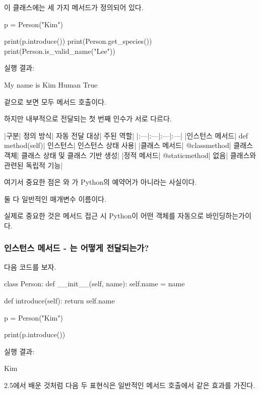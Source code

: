 이 클래스에는 세 가지 메서드가 정의되어 있다.

\begin{dhkcode}
p = Person("Kim")

print(p.introduce())
print(Person.get_species())
print(Person.is_valid_name("Lee"))
\end{dhkcode}

실행 결과:

\begin{dhkzsh}
My name is Kim
Human
True
\end{dhkzsh}

겉으로 보면 모두 메서드 호출이다.

하지만 내부적으로 전달되는 첫 번째 인수가 서로 다르다.

\begin{dhktable}
|구분|	정의 방식|	자동 전달 대상|	주된 역할|
|:---|:---|:---|:---|
|인스턴스 메서드|	def method(self)|	인스턴스|	인스턴스 상태 사용|
|클래스 메서드|	@classmethod|	클래스 객체|	클래스 상태 및 클래스 기반 생성|
|정적 메서드|	@staticmethod|	없음|	클래스와 관련된 독립적 기능|
\end{dhktable}

여기서 중요한 점은 와 가 Python의 예약어가 아니라는 사실이다.

둘 다 일반적인 매개변수 이름이다.

실제로 중요한 것은 메서드 접근 시 Python이 어떤 객체를 자동으로 바인딩하는가이다.

\subsubsection{인스턴스 메서드 - 는 어떻게 전달되는가?}

다음 코드를 보자.

\begin{dhkcode}
class Person:
    def __init__(self, name):
        self.name = name

    def introduce(self):
        return self.name

p = Person("Kim")

print(p.introduce())
\end{dhkcode}

실행 결과:

\begin{dhkzsh}
Kim
\end{dhkzsh}

2.5에서 배운 것처럼 다음 두 표현식은 일반적인 메서드 호출에서 같은 효과를 가진다.

